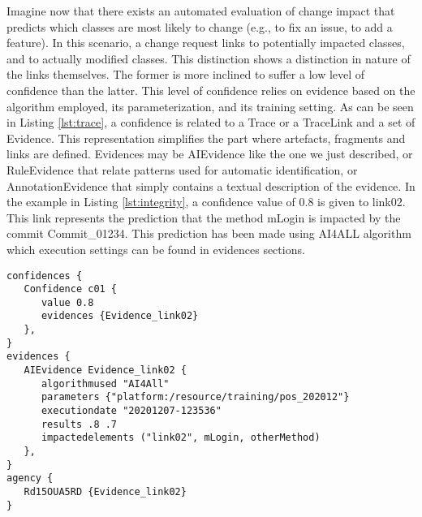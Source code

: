 Imagine now that there exists an automated evaluation of change impact that predicts which classes are most likely to change (e.g., to fix an issue, to add a feature). In this scenario, a change request links to potentially impacted classes, and to actually modified classes. This distinction shows a distinction in nature of the links themselves. The former is more inclined to suffer a low level of confidence than the latter. This level of confidence relies on evidence based on the algorithm employed, its parameterization, and its training setting. As can be seen in Listing \ref{lst:trace}, a confidence is related to a Trace or a TraceLink and a set of Evidence. This representation simplifies the part where artefacts, fragments and links are defined. Evidences may be AIEvidence like the one we just described, or RuleEvidence that relate patterns used for automatic identification, or AnnotationEvidence that simply contains a textual description of the evidence. 
In the example in Listing \ref{lst:integrity}, a confidence value of 0.8 is given to link02. This link represents the prediction that the method mLogin is impacted by the commit Commit\_01234. This prediction has been made using AI4ALL algorithm which execution settings can be found in evidences sections.

\begin{lstlisting}[caption={Confidence, evidence, and agency},label=lst:integrity]
confidences {
   Confidence c01 { 
      value 0.8
      evidences {Evidence_link02}
   },
}
evidences {
   AIEvidence Evidence_link02 {
      algorithmused "AI4All"
      parameters {"platform:/resource/training/pos_202012"}
      executiondate "20201207-123536"
      results .8 .7    
      impactedelements ("link02", mLogin, otherMethod) 
   },
}
agency {
   Rd15OUA5RD {Evidence_link02}
}
\end{lstlisting}
